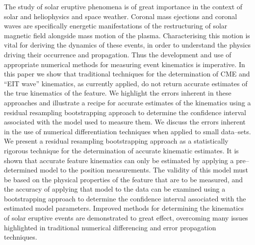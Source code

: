 \documentclass[structabstract]{aa}
\begin{document}
\date{Received ?; accepted ?}
\abstract
{The study of solar eruptive phenomena is of great importance in the context of solar and heliophysics and space weather. Coronal mass ejections and coronal waves are specifically energetic manifestations of the restructuring of solar magnetic field alongside mass motion of the plasma. Characterising this motion is vital for deriving the dynamics of these events, in order to understand the physics driving their occurrence and propagation. Thus the development and use of appropriate numerical methods for measuring event kinematics is imperative.} 
{In this paper we show that traditional techniques for the determination of CME and ``EIT wave'' kinematics, as currently applied, do not return accurate estimates of the true kinematics of the feature. We highlight the errors inherent in these approaches and illustrate a recipe for accurate estimates of the kinematics using a residual resampling bootstrapping approach to determine the confidence interval associated with the model used to measure them.}
{We discuss the errors inherent in the use of numerical differentiation techniques when applied to small data--sets. We present a residual resampling bootstrapping approach as a statistically rigorous technique for the determination of accurate kinematic estimates.}
{It is shown that accurate feature kinematics can only be estimated by applying a pre--determined model to the position measurements. The validity of this model must be based on the physical properties of the feature that are to be measured, and the accuracy of applying that model to the data can be examined using a bootstrapping approach to determine the confidence interval associated with the estimated model parameters.}
{Improved methods for determining the kinematics of solar eruptive events are demonstrated to great effect, overcoming many issues highlighted in traditional numerical differencing and error propagation techniques.}



\maketitle

%
\end{document}
